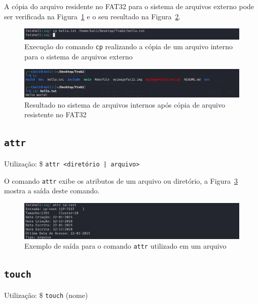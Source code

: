 \documentclass[
    12pt,				%
    oneside,   	        %
    a4paper,			%
    english,			%
    french,				%
    spanish,			%
    brazil,				%
    ]{pacotes/abntex2}
\begin{document}
A cópia do arquivo residente no FAT32 para o sistema de arquivos externo pode ser verificada na Figura~\ref{fig:cp-interno-externo-1} e o seu resultado na Figura~\ref{fig:cp-interno-externo-2}.

\begin{figure}[H]
    \centering
    \includegraphics[width=450pt]{figuras/resultados/6-cp-interno-externo.PNG}
    \caption{Execução do comando \texttt{cp} realizando a cópia de um arquivo interno para o sistema de arquivos externo}
    \label{fig:cp-interno-externo-1}
\end{figure}

\begin{figure}[H]
    \centering
    \includegraphics[width=450pt]{figuras/resultados/7-cp-arquivo-externo-resultado.PNG}
    \caption{Resultado no sistema de arquivos internos após cópia de arquivo resistente no FAT32}
    \label{fig:cp-interno-externo-2}
\end{figure}


\subsection{\texttt{attr}}
\label{subsec:attr}
Utilização: \$ \texttt{attr <diretório | arquivo> }

O comando \texttt{attr} exibe os atributos de um arquivo ou diretório, a Figura~\ref{fig:attr} mostra a saída deste comando.

\begin{figure}[H]
    \centering
    \includegraphics[width=450pt]{figuras/resultados/4-attr.PNG}
    \caption{Exemplo de saída para o comando \texttt{attr} utilizado em um arquivo}
    \label{fig:attr}
\end{figure}


\subsection{\texttt{touch}}
\label{subsec:touch}
Utilização: \$ \texttt{touch} (nome)
\end{document}

